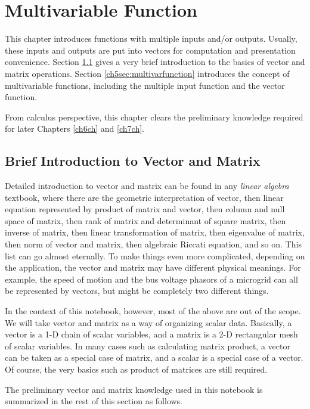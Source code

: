 \chapter{Multivariable Function}

This chapter introduces functions with multiple inputs and/or outputs. Usually, these inputs and outputs are put into vectors for computation and presentation convenience. Section \ref{ch5sec:briefintrotovectormatrix} gives a very brief introduction to the basics of vector and matrix operations. Section \ref{ch5sec:multivarfunction} introduces the concept of multivariable functions, including the multiple input function and the vector function.

From calculus perspective, this chapter clears the preliminary knowledge required for later Chapters \ref{ch6ch} and \ref{ch7ch}.

\section{Brief Introduction to Vector and Matrix} \label{ch5sec:briefintrotovectormatrix}

Detailed introduction to vector and matrix can be found in any \textit{linear algebra} textbook, where there are the geometric interpretation of vector, then linear equation represented by product of matrix and vector, then column and null space of matrix, then rank of matrix and determinant of square matrix, then inverse of matrix, then linear transformation of matrix, then eigenvalue of matrix, then norm of vector and matrix, then algebraic Riccati equation, and so on. This list can go almost eternally. To make things even more complicated, depending on the application, the vector and matrix may have different physical meanings. For example, the speed of motion and the bus voltage phasors of a microgrid can all be represented by vectors, but might be completely two different things.

In the context of this notebook, however, most of the above are out of the scope. We will take vector and matrix as a way of organizing scalar data. Basically, a vector is a 1-D chain of scalar variables, and a matrix is a 2-D rectangular mesh of scalar variables. In many cases such as calculating matrix product, a vector can be taken as a special case of matrix, and a scalar is a special case of a vector. Of course, the very basics such as product of matrices are still required.

The preliminary vector and matrix knowledge used in this notebook is summarized in the rest of this section as follows.

